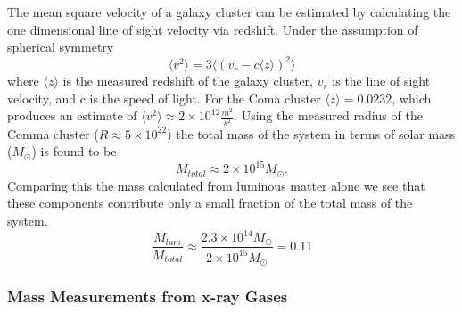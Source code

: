 \documentclass[a4paper,12pt]{article}
\begin{document}
The mean square velocity of a galaxy cluster can be estimated by calculating the one dimensional line of sight velocity via redshift.  Under the assumption of spherical symmetry
\begin{equation} \label{VirialTheorem7}
 \langle v^2 \rangle = 3 \langle (v_r - c \langle z \rangle)^2 \rangle
\end{equation} 
where $\langle z \rangle$ is the measured redshift of the galaxy cluster, $v_r$ is the line of sight velocity, and c is the speed of light.  For the Coma cluster $\langle z \rangle = 0.0232$, which produces an estimate of $\langle v^2 \rangle \approx 2 \times 10^{12} \frac{m^2}{s^2}$.\cite{ComaZ}  Using the measured radius of the Comma cluster ($R \approx 5 \times 10^{22}$) the total mass of the system in terms of solar mass ($M_{\odot}$) is found to be
\begin{equation} \label{VirialTheorem8}
M_{total} \approx 2 \times 10^{15} M_{\odot}.
\end{equation}
Comparing this the mass calculated from luminous matter alone we see that these components contribute only a small fraction of the total mass of the system. \cite{ComaZ}
\begin{equation} \label{VirialTheorem9}
\frac{M_{lum}}{M_{total}} \approx \frac{2.3 \times 10^{14} M_{\odot}}{2 \times 10^{15} M_{\odot}} = 0.11
\end{equation}

\subsubsection{Mass Measurements from x-ray Gases}
\end{document}
